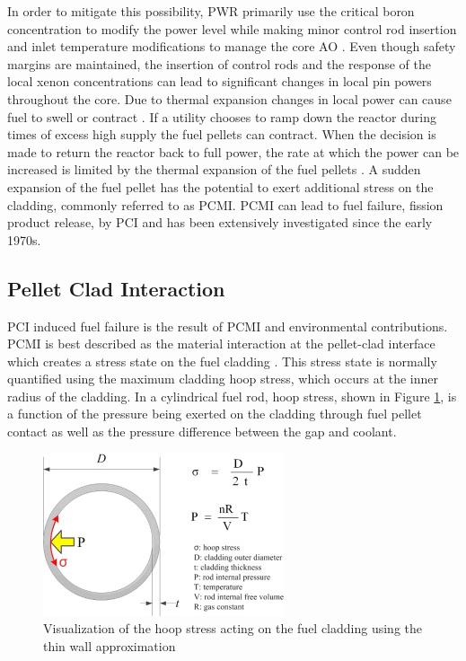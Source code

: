 \documentclass[edeposit,fullpage,11pt]{uiucthesis2009}
\begin{document}
In order to mitigate this possibility, \gls{PWR} primarily use the critical boron concentration to modify the power level while making minor control rod insertion and inlet temperature modifications to manage the core \gls{AO} \cite{meyer_improved_1978}.  
Even though safety margins are maintained, the insertion of control rods and the response of the local xenon concentrations can lead to significant changes in local pin powers throughout the core.
Due to thermal expansion changes in local power can cause fuel to swell or contract \cite{gartner_power_1984}. 
If a utility chooses to ramp down the reactor during times of excess high supply the fuel pellets can contract.
When the decision is made to return the reactor back to full power, the rate at which the power can be increased is limited by the thermal expansion of the fuel pellets \cite{gartner_power_1984}.
A sudden expansion of the fuel pellet has the potential to exert additional stress on the cladding, commonly referred to as \gls{PCMI}.
\gls{PCMI} can lead to fuel failure, fission product release, by \gls{PCI} and has been extensively investigated since the early 1970s.

\subsection{Pellet Clad Interaction}

\gls{PCI} induced fuel failure is the result of \gls{PCMI} and environmental contributions.
\gls{PCMI} is best described as the material interaction at the pellet-clad interface which creates a stress state on the fuel cladding \cite{kennard_pci_2016}.
This stress state is normally quantified using the maximum cladding hoop stress, which occurs at the inner radius of the cladding.
In a cylindrical fuel rod, hoop stress, shown in Figure \ref{fig:hoop_stress_cite}, is a function of the pressure being exerted on the cladding through fuel pellet contact as well as the pressure difference between the gap and coolant.

\begin{figure}
\begin{center}
\includegraphics[width=0.5\linewidth]{./Figures/hoop_stress_cite.jpg}
\caption{Visualization of the hoop stress acting on the fuel cladding using the thin wall approximation \cite{kook_review_2013}}
\label{fig:hoop_stress_cite}
\end{center}
\end{figure}
\end{document}
